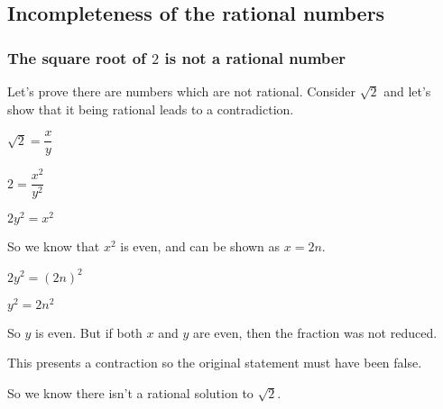 
\subsection{Incompleteness of the rational numbers}

\subsubsection{The square root of \(2\) is not a rational number}

Let's prove there are numbers which are not rational. Consider \(\sqrt 2\) and let's show that it being rational leads to a contradiction.

\(\sqrt 2=\dfrac{x}{y}\)

\(2=\dfrac{x^2}{y^2}\)

\(2y^2=x^2\)

So we know that \(x^2\) is even, and can be shown as \(x=2n\).

\(2y^2=(2n)^2\)

\(y^2=2n^2\)

So \(y\) is even. But if both \(x\) and \(y\) are even, then the fraction was not reduced.

This presents a contraction so the original statement must have been false.

So we know there isn't a rational solution to \(\sqrt 2\).

